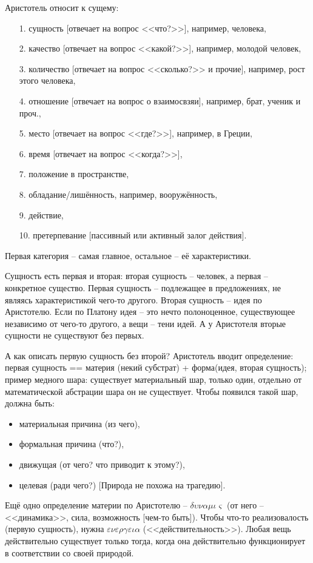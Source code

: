 \documentclass[a4paper, 12pt]{book} %
\begin{document}
Аристотель относит к сущему:
\begin{itemize}
\item[1.] сущность [отвечает на вопрос <<что?>>], например, человека,
\item[2.] качество [отвечает на вопрос <<какой?>>], например, молодой человек,
\item[3.] количество [отвечает на вопрос <<сколько?>> и прочие], например, рост этого человека,
\item[4.] отношение [отвечает на вопрос о взаимосвзяи], например, брат, ученик и проч.,
\item[5.] место [отвечает на вопрос <<где?>>], например, в Греции,
\item[6.] время [отвечает на вопрос <<когда?>>],
\item[7.] положение в пространстве,
\item[8.] обладание/лишённость, например, вооружённость,
\item[9.] действие,
\item[10.] претерпевание [пассивный или активный залог действия].
\end{itemize}


Первая категория -- самая главное, остальное -- её характеристики.

Сущность есть первая и вторая: вторая сущность -- человек, а первая -- конкретное существо. Первая сущность -- подлежащее в предложениях, не являясь характеристикой чего-то другого. Вторая сущность -- идея по Аристотелю. Если по Платону идея -- это нечто полоноценное, существующее независимо от чего-то другого, а вещи -- тени идей. А у Аристотеля вторые сущности не существуют без первых. 

А как описать первую сущность без второй? Аристотель вводит определение: первая сущность == материя (некий субстрат) + форма(идея, вторая сущность); пример медного шара: существует материальный шар, только один, отдельно от математической абстрации шара он не существует.
Чтобы появился такой шар, должна быть:
\begin{itemize}
\item материальная причина (из чего),
\item формальная причина (что?),
\item движущая (от чего? что приводит к этому?), 
\item целевая (ради чего?) [Природа не похожа на трагедию].
\end{itemize}

Ещё одно определение материи по Аристотелю -- $\delta \upsilon \nu \alpha \mu \iota \varsigma$ (от него -- <<динамика>>, сила, возможность [чем-то быть]). Чтобы что-то реализовалость (первую сущность), нужна $	\varepsilon \nu \varepsilon \rho \gamma \varepsilon \iota \alpha$ (<<действительность>>). Любая вещь действительно существует только тогда, когда она действительно функционирует в соответствии со своей природой.
\end{document}
